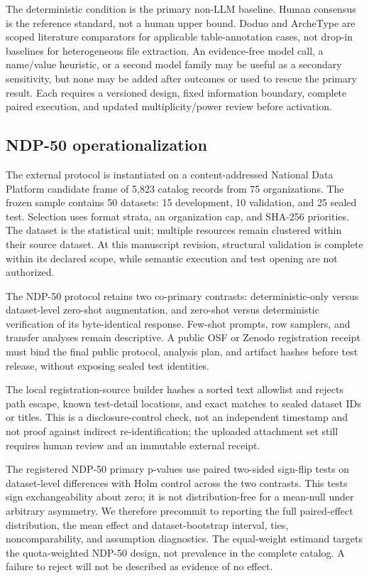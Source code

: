 \documentclass[11pt]{article}
\begin{document}
The deterministic condition is the primary non-LLM baseline. Human consensus is
the reference standard, not a human upper bound. Doduo and ArcheType are scoped
literature comparators for applicable table-annotation cases, not drop-in
baselines for heterogeneous file extraction. An evidence-free model call, a
name/value heuristic, or a second model family may be useful as a secondary
sensitivity, but none may be added after outcomes or used to rescue the primary
result. Each requires a versioned design, fixed information boundary, complete
paired execution, and updated multiplicity/power review before activation.

\subsection{NDP-50 operationalization}

The external protocol is instantiated on a content-addressed National Data
Platform candidate frame of 5,823 catalog records from 75 organizations. The
frozen sample contains 50 datasets: 15 development, 10 validation, and 25 sealed
test. Selection uses format strata, an organization cap, and SHA-256 priorities.
The dataset is the statistical unit; multiple resources remain clustered within
their source dataset. At this manuscript revision, structural validation is
complete within its declared scope, while semantic execution and test opening are
not authorized.

The NDP-50 protocol retains two co-primary contrasts: deterministic-only versus
dataset-level zero-shot augmentation, and zero-shot versus deterministic
verification of its byte-identical response. Few-shot prompts, row samplers, and
transfer analyses remain descriptive. A public OSF or Zenodo registration receipt
must bind the final public protocol, analysis plan, and artifact hashes before test
release, without exposing sealed test identities.

The local registration-source builder hashes a sorted text allowlist and rejects
path escape, known test-detail locations, and exact matches to sealed dataset IDs
or titles. This is a disclosure-control check, not an independent timestamp and
not proof against indirect re-identification; the uploaded attachment set still
requires human review and an immutable external receipt.

The registered NDP-50 primary p-values use paired two-sided sign-flip tests on
dataset-level differences with Holm control across the two contrasts. This tests
sign exchangeability about zero; it is not distribution-free for a mean-null under
arbitrary asymmetry. We therefore precommit to reporting the full paired-effect
distribution, the mean effect and dataset-bootstrap interval, ties,
noncomparability, and assumption diagnostics. The equal-weight estimand targets
the quota-weighted NDP-50 design, not prevalence in the complete catalog. A
failure to reject will not be described as evidence of no effect.
\end{document}
